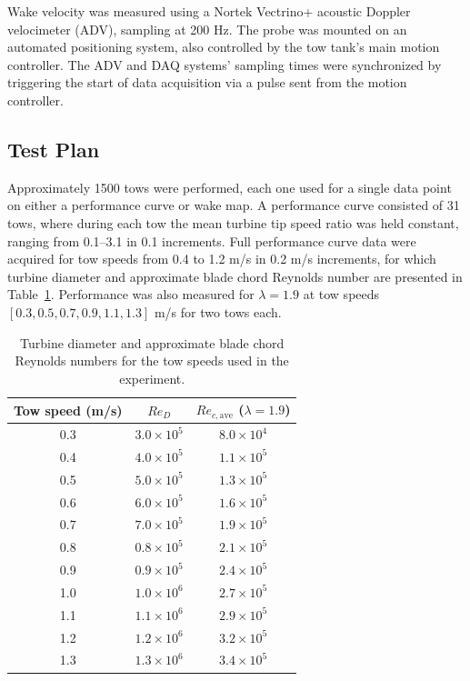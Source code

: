 \documentclass[energies,article,accept,moreauthors,pdftex,12pt,a4paper]{mdpi}
\begin{document}
Wake velocity was measured using a Nortek Vectrino+ acoustic Doppler velocimeter
(ADV), sampling at 200 Hz. The probe was mounted on an automated positioning
system, also controlled by the tow tank's main motion controller. The ADV and
DAQ systems' sampling times were synchronized by triggering the start of data
acquisition via a pulse sent from the motion controller.

\subsection{Test Plan} 

Approximately 1500 tows were performed, each one used for a single data point on
either a performance curve or wake map. A performance curve consisted of 31
tows, where during each tow the mean turbine tip speed ratio was held constant,
ranging from 0.1--3.1 in 0.1 increments. Full performance curve data were
acquired for tow speeds from 0.4 to 1.2 m/s in 0.2 m/s increments, for which
turbine diameter and approximate blade chord Reynolds number are presented in
Table~\ref{tab:Re}. Performance was also measured for $\lambda=1.9$ at tow
speeds $[0.3, 0.5, 0.7, 0.9, 1.1, 1.3]$ m/s for two tows each.

\begin{table}
\centering
\begin{tabular}{ccc}
Tow speed (m/s) & $Re_D$ & $Re_{c,\mathrm{ave}}$ ($\lambda = 1.9$) \\ 
\hline
0.3 & $3.0 \times 10^5$ & $8.0 \times 10^4$ \\ 
0.4 & $4.0 \times 10^5$ & $1.1 \times 10^5$ \\ 
0.5 & $5.0 \times 10^5$ & $1.3 \times 10^5$ \\ 
0.6 & $6.0 \times 10^5$ & $1.6 \times 10^5$ \\ 
0.7 & $7.0 \times 10^5$ & $1.9 \times 10^5$ \\ 
0.8 & $0.8 \times 10^5$ & $2.1 \times 10^5$ \\ 
0.9 & $0.9 \times 10^5$ & $2.4 \times 10^5$ \\ 
1.0 & $1.0 \times 10^6$ & $2.7 \times 10^5$ \\ 
1.1 & $1.1 \times 10^6$ & $2.9 \times 10^5$ \\ 
1.2 & $1.2 \times 10^6$ & $3.2 \times 10^5$ \\ 
1.3 & $1.3 \times 10^6$ & $3.4 \times 10^5$ \\ 
\end{tabular} 
\caption{Turbine diameter and approximate blade chord Reynolds numbers for the
tow speeds used in the experiment.}
\label{tab:Re}
\end{table}
\end{document}
